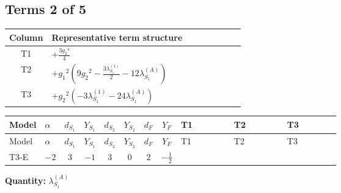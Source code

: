 \documentclass[8pt]{article}
\begin{document}
\begin{landscape}
\subsection*{Terms 2 of 5}
\begin{center}
\begin{tabular}{@{}c >{\raggedright\arraybackslash}p{0.82\linewidth}@{}}
\toprule
Column & Representative term structure \\
\midrule
T1 & \(\displaystyle +\frac{3 {g_2}^4}{4}\) \\
\midrule
T2 & \(\displaystyle +{g_1}^2 \left(9 {g_2}^2-\frac{3 {\lambda_{S_1}^{(1)}}}{2}-12 {\lambda_{S_1}^{(A)}}\right)\) \\
\midrule
T3 & \(\displaystyle +{g_2}^2 (-3 {\lambda_{S_1}^{(1)}}-24 {\lambda_{S_1}^{(A)}})\) \\
\midrule
\bottomrule
\end{tabular}
\end{center}
\smallskip
\tiny
\begin{longtable}{@{}llcccccc >{\raggedright\arraybackslash}p{0.21\linewidth} >{\raggedright\arraybackslash}p{0.21\linewidth} >{\raggedright\arraybackslash}p{0.21\linewidth}@{}}
\toprule
Model & $\alpha$ & $d_{S_1}$ & $Y_{S_1}$ & $d_{S_2}$ & $Y_{S_2}$ & $d_F$ & $Y_F$ & T1 & T2 & T3 \\
\midrule
\endfirsthead
\toprule
Model & $\alpha$ & $d_{S_1}$ & $Y_{S_1}$ & $d_{S_2}$ & $Y_{S_2}$ & $d_F$ & $Y_F$ & T1 & T2 & T3 \\
\midrule
\endhead
T3-E & $-2$ & $3$ & $-1$ & $3$ & $0$ & $2$ & $-\frac{1}{2}$ & \scriptsize\adjustbox{max width=\linewidth}{$\begin{gathered} +\frac{3 {g_2}^4}{4}\end{gathered}$} & \scriptsize\adjustbox{max width=\linewidth}{$\begin{gathered} +{g_1}^2 \left(9 {g_2}^2-\frac{3 {\lambda_{S_1}^{(1)}}}{2}-12 {\lambda_{S_1}^{(A)}}\right)\end{gathered}$} & \scriptsize\adjustbox{max width=\linewidth}{$\begin{gathered} +{g_2}^2 (-3 {\lambda_{S_1}^{(1)}}-24 {\lambda_{S_1}^{(A)}})\end{gathered}$} \\
\midrule
\bottomrule
\end{longtable}
\clearpage
\noindent\textbf{Quantity: }$\lambda_{S_1}^{(A)}$\par\smallskip

\end{landscape}
\end{document}
